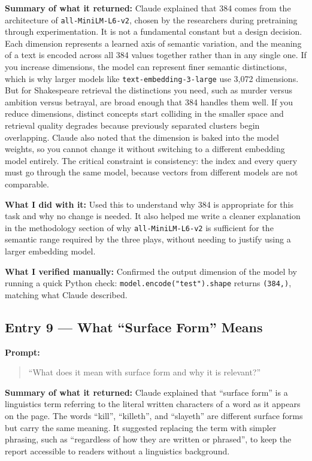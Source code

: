 \documentclass[10pt,conference]{IEEEtran}
\begin{document}
\textbf{Summary of what it returned:}
Claude explained that 384 comes from the architecture of
\texttt{all-MiniLM-L6-v2}, chosen by the researchers during pretraining
through experimentation. It is not a fundamental constant but a design
decision. Each dimension represents a learned axis of semantic variation,
and the meaning of a text is encoded across all 384 values together
rather than in any single one. If you increase dimensions, the model can
represent finer semantic distinctions, which is why larger models like
\texttt{text-embedding-3-large} use 3,072 dimensions. But for
Shakespeare retrieval the distinctions you need, such as murder versus
ambition versus betrayal, are broad enough that 384 handles them well.
If you reduce dimensions, distinct concepts start colliding in the
smaller space and retrieval quality degrades because previously
separated clusters begin overlapping. Claude also noted that the
dimension is baked into the model weights, so you cannot change it
without switching to a different embedding model entirely. The critical
constraint is consistency: the index and every query must go through the
same model, because vectors from different models are not comparable.

\textbf{What I did with it:}
Used this to understand why 384 is appropriate for this task and why
no change is needed. It also helped me write a cleaner explanation in
the methodology section of why \texttt{all-MiniLM-L6-v2} is sufficient
for the semantic range required by the three plays, without needing to
justify using a larger embedding model.

\textbf{What I verified manually:}
Confirmed the output dimension of the model by running a quick Python
check: \texttt{model.encode("test").shape} returns \texttt{(384,)},
matching what Claude described.

\subsection*{Entry 9 --- What ``Surface Form'' Means}

\textbf{Prompt:}
\begin{quote}
``What does it mean with surface form and why it is relevant?''
\end{quote}

\textbf{Summary of what it returned:}
Claude explained that ``surface form'' is a linguistics term referring
to the literal written characters of a word as it appears on the page.
The words ``kill'', ``killeth'', and ``slayeth'' are different surface
forms but carry the same meaning. It suggested replacing the term with
simpler phrasing, such as ``regardless of how they are written or
phrased'', to keep the report accessible to readers without a
linguistics background.
\end{document}
